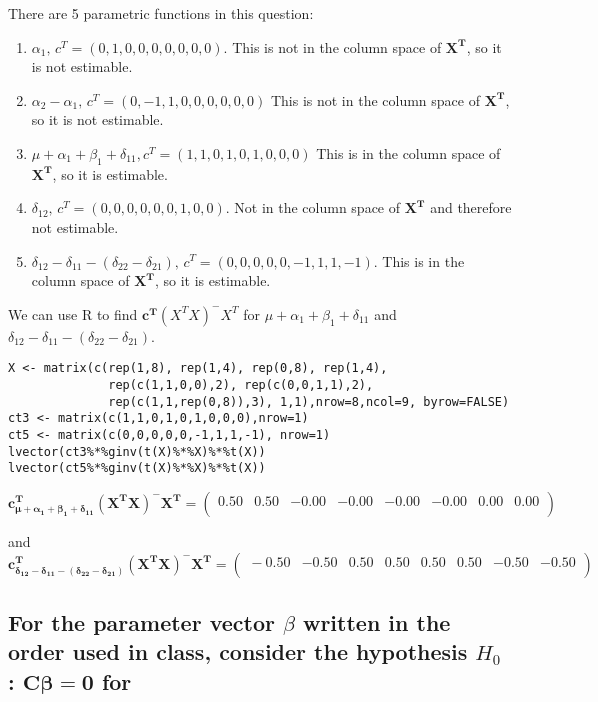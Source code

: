 \documentclass[11pt]{article}
\begin{document}
There are 5 parametric functions in this question:

\begin{enumerate}
\item $\alpha_1,\, c^T=(0,1,0,0,0,0,0,0,0)$. This is not in the column
    space of $\mathbf{X^T}$, so it is not estimable.
\item $\alpha_2 - \alpha_1,\,c^T=(0,-1,1,0,0,0,0,0,0)$ This is not in the column
    space of $\mathbf{X^T}$, so it is not estimable.
\item $\mu + \alpha_1 + \beta_1 +\delta_{11}, c^T=(1,1,0,1,0,1,0,0,0)$
    This is in the column space of $\mathbf{X^T}$, so it is estimable.
\item $\delta_{12},\,c^T=(0,0,0,0,0,0,1,0,0)$.  Not in the column space
    of $\mathbf{X^T}$ and therefore not estimable.
\item $\delta_{12} - \delta_{11} - (\delta_{22} -
    \delta_{21}),\,c^T=(0,0,0,0,0,-1,1,1,-1)$. This is in the column
    space of $\mathbf{X^T}$, so it is estimable.
\end{enumerate}

We can use R to find $\mathbf{c^T}(X^T X)^{-}X^T$ for $\mu +
\alpha_1 + \beta_1 +\delta_11$
 and $\delta_12 - \delta_11 - (\delta_22 -
    \delta_21)$.


\begin{verbatim}
X <- matrix(c(rep(1,8), rep(1,4), rep(0,8), rep(1,4), 
              rep(c(1,1,0,0),2), rep(c(0,0,1,1),2),
              rep(c(1,1,rep(0,8)),3), 1,1),nrow=8,ncol=9, byrow=FALSE)
ct3 <- matrix(c(1,1,0,1,0,1,0,0,0),nrow=1)
ct5 <- matrix(c(0,0,0,0,0,-1,1,1,-1), nrow=1)
lvector(ct3%*%ginv(t(X)%*%X)%*%t(X))
lvector(ct5%*%ginv(t(X)%*%X)%*%t(X))
\end{verbatim}

\[
\mathbf{c_{\mu +\alpha_1 + \beta_1 +\delta_11}^T (X^TX)^{-}X^T} =
\begin{pmatrix}{}
  0.50 & 0.50 & -0.00 & -0.00 & -0.00 & -0.00 & 0.00 & 0.00 \\ 
  \end{pmatrix}
\]

and
\[
\mathbf{c_{\delta_{12} - \delta_{11} - (\delta_{22} -
    \delta_{21})}^T  (X^TX)^{-}X^T} =
\begin{pmatrix}{}
  -0.50 & -0.50 & 0.50 & 0.50 & 0.50 & 0.50 & -0.50 & -0.50 \\ 
  \end{pmatrix}
\]
\subsection{For the parameter vector $\beta$ written in the order used in class, consider the hypothesis $H_0$ : $\mathbf{C\beta} = \mathbf{0}$ for}
\label{sec-5-2}
\end{document}
